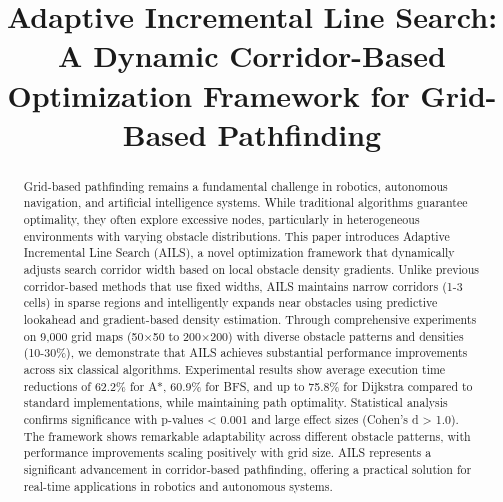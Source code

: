 \documentclass[journal]{IEEEtran}
\begin{document}
\title{Adaptive Incremental Line Search: A Dynamic Corridor-Based Optimization Framework for Grid-Based Pathfinding}

\author{
}

\maketitle

\begin{abstract}
Grid-based pathfinding remains a fundamental challenge in robotics, autonomous navigation, and artificial intelligence systems. While traditional algorithms guarantee optimality, they often explore excessive nodes, particularly in heterogeneous environments with varying obstacle distributions. This paper introduces Adaptive Incremental Line Search (AILS), a novel optimization framework that dynamically adjusts search corridor width based on local obstacle density gradients. Unlike previous corridor-based methods that use fixed widths, AILS maintains narrow corridors (1-3 cells) in sparse regions and intelligently expands near obstacles using predictive lookahead and gradient-based density estimation. Through comprehensive experiments on 9,000 grid maps (50×50 to 200×200) with diverse obstacle patterns and densities (10-30\%), we demonstrate that AILS achieves substantial performance improvements across six classical algorithms. Experimental results show average execution time reductions of 62.2\% for A*, 60.9\% for BFS, and up to 75.8\% for Dijkstra compared to standard implementations, while maintaining path optimality. Statistical analysis confirms significance with p-values < 0.001 and large effect sizes (Cohen's d > 1.0). The framework shows remarkable adaptability across different obstacle patterns, with performance improvements scaling positively with grid size. AILS represents a significant advancement in corridor-based pathfinding, offering a practical solution for real-time applications in robotics and autonomous systems.
\end{abstract}
\end{document}
